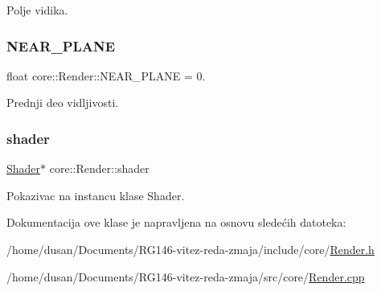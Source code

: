 Polje vidika. 

\mbox{\label{classcore_1_1Render_a21b18ddc1ea04e877e9218e92cbb8a0a}} 
\subsubsection{\texorpdfstring{N\+E\+A\+R\+\_\+\+P\+L\+A\+NE}{NEAR\_PLANE}}
{\footnotesize\ttfamily float core\+::\+Render\+::\+N\+E\+A\+R\+\_\+\+P\+L\+A\+NE = 0.\hspace{0.3cm}{\ttfamily [private]}}



Prednji deo vidljivosti. 

\mbox{\label{classcore_1_1Render_a220be4bb26b6cbec909953f247a7732c}} 
\subsubsection{\texorpdfstring{shader}{shader}}
{\footnotesize\ttfamily \hyperlink{classshader_1_1Shader}{Shader}$\ast$ core\+::\+Render\+::shader\hspace{0.3cm}{\ttfamily [private]}}



Pokazivac na instancu klase Shader. 



Dokumentacija ove klase je napravljena na osnovu sledećih datoteka\+:\begin{DoxyCompactItemize}
\item 
/home/dusan/\+Documents/\+R\+G146-\/vitez-\/reda-\/zmaja/include/core/\hyperlink{Render_8h}{Render.\+h}\item 
/home/dusan/\+Documents/\+R\+G146-\/vitez-\/reda-\/zmaja/src/core/\hyperlink{Render_8cpp}{Render.\+cpp}\end{DoxyCompactItemize}
